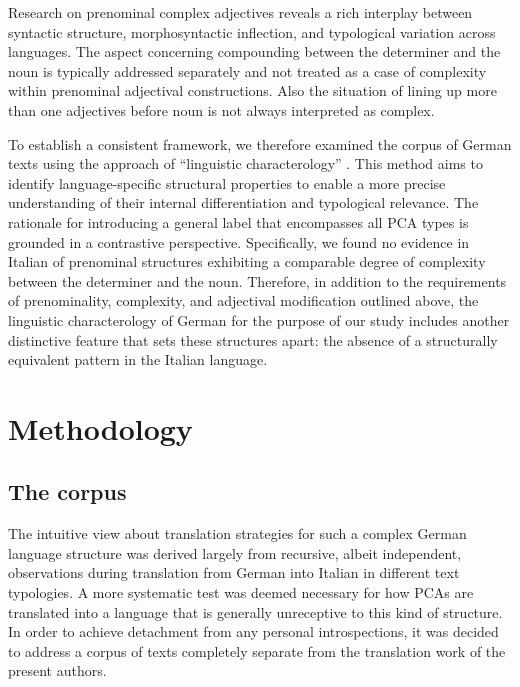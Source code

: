 \documentclass[output=paper,colorlinks,citecolor=brown]{langscibook}
\begin{document}
Research on prenominal complex adjectives reveals a rich interplay between syntactic structure, morphosyntactic inflection, and typological variation across languages. The aspect concerning compounding between the determiner and the noun is typically addressed separately and not treated as a case of complexity within prenominal adjectival constructions. Also the situation of lining up more than one adjectives before noun is not always interpreted as complex.

To establish a consistent framework, we therefore examined the corpus of German texts using the approach of “linguistic characterology” \citep{Mathesius1975}. This method aims to identify language-specific structural properties to enable a more precise understanding of their internal differentiation and typological relevance. The rationale for introducing a general label that encompasses all PCA types is grounded in a contrastive perspective. Specifically, we found no evidence in Italian of prenominal structures exhibiting a comparable degree of complexity between the determiner and the noun. Therefore, in addition to the requirements of prenominality, complexity, and adjectival modification outlined above, the linguistic characterology of German for the purpose of our study includes another distinctive feature that sets these structures apart: the absence of a structurally equivalent pattern in the Italian language.

\section{Methodology}\label{sec:resi:3}

\subsection{The corpus}

The intuitive view about translation strategies for such a complex German language structure was derived largely from recursive, albeit independent, observations during translation from German into Italian in different text typologies. A more systematic test was deemed necessary for how PCAs are translated into a language that is generally unreceptive to this kind of structure. In order to achieve detachment from any personal introspections, it was decided to address a corpus of texts completely separate from the translation work of the present authors.
\end{document}
